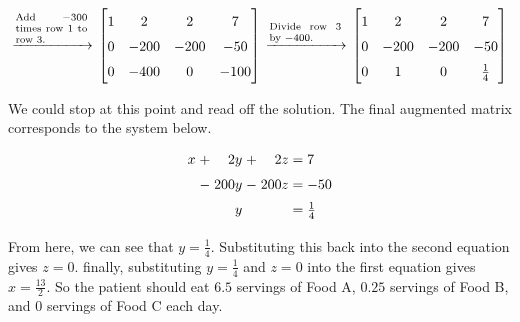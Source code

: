 \begin{example}
	\[
		\setlength{\tabcolsep}{2pt}
		\renewcommand{\arraystretch}{1.5}
		\begin{tabular}{rccc}
			$\xrightarrow{\begin{minipage}{0.15\textwidth} \scriptsize Add $-300$ times row 1 to row 3.
			\end{minipage}}$
			&
			$\begin{bmatrix}
				1 & 2 & 2 & 7\\
				0 & -200 & -200 & -50\\
				0& -400 & 0 & -100
			\end{bmatrix}$
			&
			$\xrightarrow{\begin{minipage}{0.15\textwidth} \scriptsize Divide row 3 by $-400$.
			\end{minipage}}$
			&
			$\begin{bmatrix}
				1 & 2 & 2 & 7\\
				0 & -200 & -200 & -50\\
				0& 1 & 0 & \frac{1}{4}
			\end{bmatrix}$
		\end{tabular}
	\]
		
		
	We could stop at this point and read off the solution. The final augmented matrix corresponds to the system below.
	\[
	\arraycolsep=1.4pt
	\begin{array}{rcrcrl}
		x &+& 2y &+& 2z &= 7\\
		&-& 200y &-& 200z &= -50\\
		&& y && &= \frac{1}{4}
	\end{array}
	\]
	
	From here, we can see that $y = \frac{1}{4}$. Substituting this back into the second equation gives $z = 0$. finally, substituting $y = \frac{1}{4}$ and $z = 0$ into the first equation gives $x = \frac{13}{2}$. So the patient should eat $6.5$ servings of Food A, $0.25$ servings of Food B, and $0$ servings of Food C each day.
	

\end{example}
